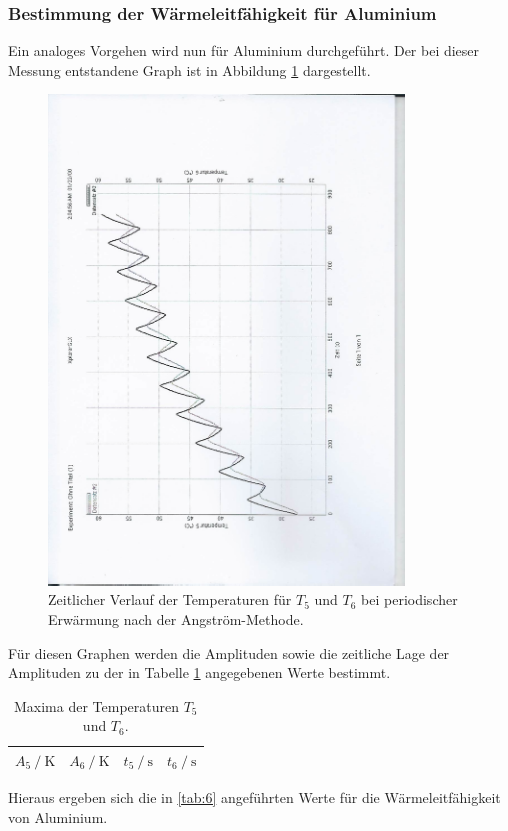 \subsubsection{Bestimmung der Wärmeleitfähigkeit für Aluminium}
Ein analoges Vorgehen wird nun für Aluminium durchgeführt.
Der bei dieser Messung entstandene Graph ist in Abbildung \ref{fig:6} dargestellt.
\begin{figure}
  \centering
  \includegraphics[height=13cm, angle=270]{scan-2.jpg}
  \caption{Zeitlicher Verlauf der Temperaturen für $T_5$ und $T_6$ bei periodischer Erwärmung nach der Angström-Methode.}
  \label{fig:6}
\end{figure}
Für diesen Graphen werden die Amplituden sowie die zeitliche Lage der Amplituden zu der in Tabelle \ref{tab:5} angegebenen Werte bestimmt.
\begin{table}
  \centering
  \caption{Maxima der Temperaturen $T_5$ und $T_6$.}
  \label{tab:5}
  \begin{tabular}{c c c c}
    \toprule
    {$A_5 \:/\: \si{\kelvin}$} & {$A_6 \:/\: \si{\kelvin}$}  & {$t_5 \:/\: \si{\second}$}  & {$t_6 \:/\: \si{\second}$}\\
    \midrule
    
    \bottomrule
  \end{tabular}
\end{table}
Hieraus ergeben sich die in \ref{tab:6} angeführten Werte für die Wärmeleitfähigkeit von Aluminium.
